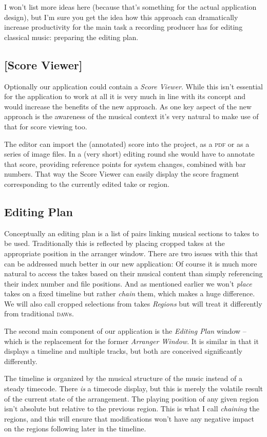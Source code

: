 \documentclass[11pt,a4paper]{article}
\begin{document}
I won't list more ideas here (because that's something for the actual
application design), but I'm sure you get the idea how this approach can
dramatically increase productivity for the main task a recording producer has
for editing classical music: preparing the editing plan.

\subsection{[Score Viewer]}
Optionally our application could contain a \emph{Score Viewer}.
While this isn't essential for the application to work at all it is very much in
line with its concept and would increase the benefits of the new approach.
As one key aspect of the new approach is the awareness of the musical context
it's very natural to make use of that for score viewing too.

The editor can import the (annotated) score into the project, as a \textsc{pdf} or as a
series of image files.
In a (very short) editing round she would have to annotate that score, providing
reference points for system changes, combined with bar numbers.
That way the Score Viewer can easily display the score fragment corresponding to
the currently edited take or region.

\subsection{Editing Plan}
Conceptually an editing plan is a list of pairs linking musical sections to
takes to be used.
Traditionally this is reflected by placing cropped takes at the appropriate
position in the arranger window.
There are two issues with this that can be addressed much better in our new
application:
Of course it is much more natural to access the takes based on their musical
content than simply referencing their index number and file positions.
And as mentioned earlier we won't \emph{place} takes on a fixed timeline but
rather \emph{chain} them, which makes a huge difference.
We will also call cropped selections from takes \emph{Regions} but will treat it
differently from traditional \textsc{daw}s.

\medskip
The second main component of our application is the \emph{Editing Plan} window
-- which is the replacement for the former \emph{Arranger Window}.
It is similar in that it displays a timeline and multiple tracks, but both are
conceived significantly differently.

The timeline is organized by the musical structure of the music instead of a
steady timecode.
There \emph{is} a timecode display, but this is merely the volatile result of
the current state of the arrangement.
The playing position of any given region isn't absolute but relative to the
previous region.
This is what I call \emph{chaining} the regions, and this will ensure that
modifications won't have any negative impact on the regions following later in
the timeline.
\end{document}
